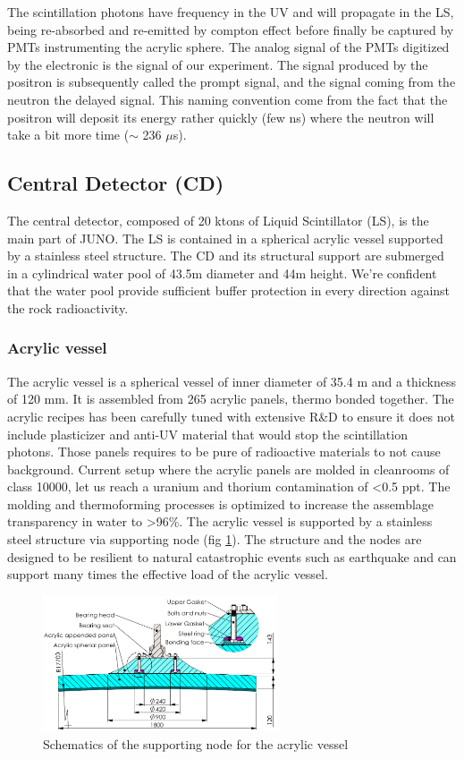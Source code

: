 The scintillation photons have frequency in the UV and will propagate in the LS, being re-absorbed and re-emitted by compton effect before finally be captured by PMTs instrumenting the acrylic sphere. The analog signal of the PMTs digitized by the electronic is the signal of our experiment. The signal produced by the positron is subsequently called the prompt signal, and the signal coming from the neutron the delayed signal. This naming convention come from the fact that the positron will deposit its energy rather quickly (few ns) where the neutron will take a bit more time ($\sim$ 236 $\mu$s).

\subsection{Central Detector (CD)}
\label{sec:juno:CD}

The central detector, composed of 20 ktons of Liquid Scintillator (LS), is the main part of JUNO. The LS is contained in a spherical acrylic vessel supported by a stainless steel structure. The CD and its structural support are submerged in a cylindrical water pool of 43.5m diameter and 44m height. We're confident that the water pool provide sufficient buffer protection in every direction against the rock radioactivity.
\subsubsection{Acrylic vessel}
The acrylic vessel is a spherical vessel of inner diameter of 35.4 m and a thickness of 120 mm. It is assembled from 265 acrylic panels, thermo bonded together. The acrylic recipes has been carefully tuned with extensive R\&D to ensure it does not include plasticizer and anti-UV material that would stop the scintillation photons.
Those panels requires to be pure of radioactive materials to not cause background. Current setup where the acrylic panels are molded in cleanrooms of class 10000, let us reach a uranium and thorium contamination of <0.5 ppt. The molding and thermoforming processes is optimized to increase the assemblage transparency in water to >96\%. The acrylic vessel is supported by a stainless steel structure via supporting node (fig \ref{fig:juno:sup_node}). The structure and the nodes are designed to be resilient to natural catastrophic events such as earthquake and can support many times the effective load of the acrylic vessel.

\begin{figure}[ht]
  \centering
  \includegraphics[height=4cm]{images/juno/node_b.png}
  \caption{Schematics of the supporting node for the acrylic vessel}
  \label{fig:juno:sup_node}
\end{figure}

